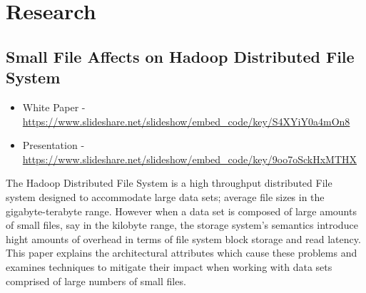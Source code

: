 \documentclass[12pt letterpaper notitlepage]{article}
\begin{document}
\section*{Research}
\label{sec:orge6a4c71}

\subsection*{Small File Affects on Hadoop Distributed File System}
\label{sec:orgdf01f4f}

\begin{itemize}
\item White Paper - \url{https://www.slideshare.net/slideshow/embed\_code/key/S4XYiY0a4mOn8}
\item Presentation - \url{https://www.slideshare.net/slideshow/embed\_code/key/9oo7oSckHxMTHX}
\end{itemize}

The Hadoop Distributed File System is a high throughput distributed File system designed to accommodate large data sets; average file sizes in the gigabyte-terabyte range. However when a data set is composed of large amounts of small files, say in the kilobyte range, the storage system's semantics introduce hight amounts of overhead in terms of file system block storage and read latency. This paper explains the architectural attributes which cause these problems and examines techniques to mitigate their impact when working with data sets comprised of large numbers of small files.
\end{document}
